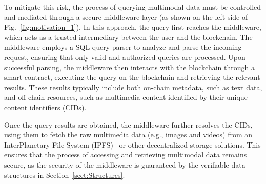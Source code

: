 To mitigate this risk, the process of querying multimodal data must be controlled and mediated through a secure middleware layer (as shown on the left side of Fig.~\ref{fig:motivation_1}).
In this approach, the query first reaches the middleware, which acts as a trusted intermediary between the user and the blockchain. 
The middleware employs a SQL query parser to analyze and parse the incoming request, ensuring that only valid and authorized queries are processed. Upon successful parsing, the middleware then interacts with the blockchain through a smart contract, executing the query on the blockchain and retrieving the relevant results. 
These results typically include both on-chain metadata, such as text data, and off-chain resources, such as multimedia content identified by their unique content identifiers (CIDs).


Once the query results are obtained, the middleware further resolves the CIDs, using them to fetch the raw multimedia data (e.g., images and videos) from an InterPlanetary File System (IPFS)~\cite{benet2014ipfscontentaddressed} or other decentralized storage solutions. 
This ensures that the process of accessing and retrieving multimodal data remains secure, as the security of the middleware is guaranteed by the verifiable data structures in Section~\ref{sect:Structures}.


